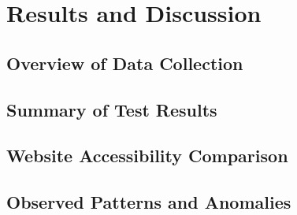 \chapter{Results and Discussion}

\section{Overview of Data Collection}

\section{Summary of Test Results}

\section{Website Accessibility Comparison}

\section{Observed Patterns and Anomalies}

